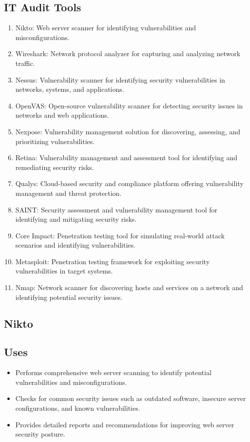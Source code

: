 \documentclass[11pt]{article}
\begin{document}
\subsection{IT Audit Tools}
\begin{enumerate}
    \item Nikto: Web server scanner for identifying vulnerabilities and misconfigurations.
    \item Wireshark: Network protocol analyzer for capturing and analyzing network traffic.
    \item Nessus: Vulnerability scanner for identifying security vulnerabilities in networks, systems, and applications.
    \item OpenVAS: Open-source vulnerability scanner for detecting security issues in networks and web applications.
    \item Nexpose: Vulnerability management solution for discovering, assessing, and prioritizing vulnerabilities.
    \item Retina: Vulnerability management and assessment tool for identifying and remediating security risks.
    \item Qualys: Cloud-based security and compliance platform offering vulnerability management and threat protection.
    \item SAINT: Security assessment and vulnerability management tool for identifying and mitigating security risks.
    \item Core Impact: Penetration testing tool for simulating real-world attack scenarios and identifying vulnerabilities.
    \item Metasploit: Penetration testing framework for exploiting security vulnerabilities in target systems.
    \item Nmap: Network scanner for discovering hosts and services on a network and identifying potential security issues.
\end{enumerate}


\subsection{Nikto}

\subsection{Uses}
\begin{itemize}
    \item Performs comprehensive web server scanning to identify potential vulnerabilities and misconfigurations.
    \item Checks for common security issues such as outdated software, insecure server configurations, and known vulnerabilities.
    \item Provides detailed reports and recommendations for improving web server security posture.
\end{itemize}
\end{document}
